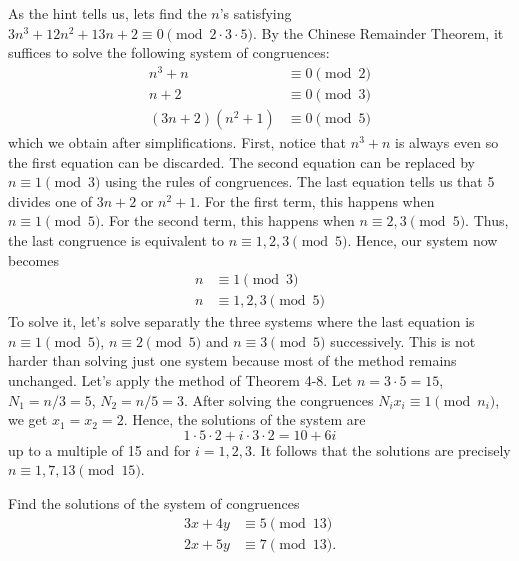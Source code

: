 \begin{solution}
    As the hint tells us, lets find the $n$'s satisfying $3n^3 + 12n^2 + 13n + 2 \equiv 0 \pmod{2 \cdot 3 \cdot 5}$. By the Chinese Remainder Theorem, it suffices to solve the following system of congruences:
    \begin{align*}
        n^3 + n&\equiv 0 \pmod{2} \\
        n + 2 &\equiv 0 \pmod{3} \\
        (3n+2)(n^2+1) &\equiv 0 \pmod{5} 
    \end{align*}
    which we obtain after simplifications. First, notice that $n^3 + n$ is always even so the first equation can be discarded. The second equation can be replaced by $n \equiv 1 \pmod 3$ using the rules of congruences. The last equation tells us that 5 divides one of $3n + 2$ or $n^2 + 1$. For the first term, this happens when $n \equiv 1 \pmod 5$. For the second term, this happens when $n \equiv 2,3 \pmod 5$. Thus, the last congruence is equivalent to $n \equiv 1,2,3 \pmod 5$. Hence, our system now becomes
    \begin{align*}
        n &\equiv 1 \pmod{3} \\
        n &\equiv 1,2,3 \pmod{5} 
    \end{align*}
    To solve it, let's solve separatly the three systems where the last equation is $n \equiv 1 \pmod 5$, $n \equiv 2 \pmod 5$ and $n \equiv 3 \pmod 5$ successively. This is not harder than solving just one system because most of the method remains unchanged. Let's apply the method of Theorem 4-8. Let $n = 3 \cdot 5 = 15$, $N_1 = n / 3 = 5$, $N_2 = n / 5 = 3$. After solving the congruences $N_i x_i \equiv 1 \pmod{n_i}$, we get $x_1 = x_2 = 2$. Hence, the solutions of the system are
    $$1 \cdot 5 \cdot 2 + i \cdot 3 \cdot 2 = 10 + 6i$$
    up to a multiple of 15 and for $i = 1,2,3$. It follows that the solutions are precisely $n \equiv 1,7, 13 \pmod{15}$. \\
\end{solution}

\begin{exercise}
    Find the solutions of the system of congruences
    \begin{align*}
        3x + 4y &\equiv 5 \pmod{13} \\
        2x + 5y &\equiv 7 \pmod{13}.
    \end{align*}
\end{exercise}

